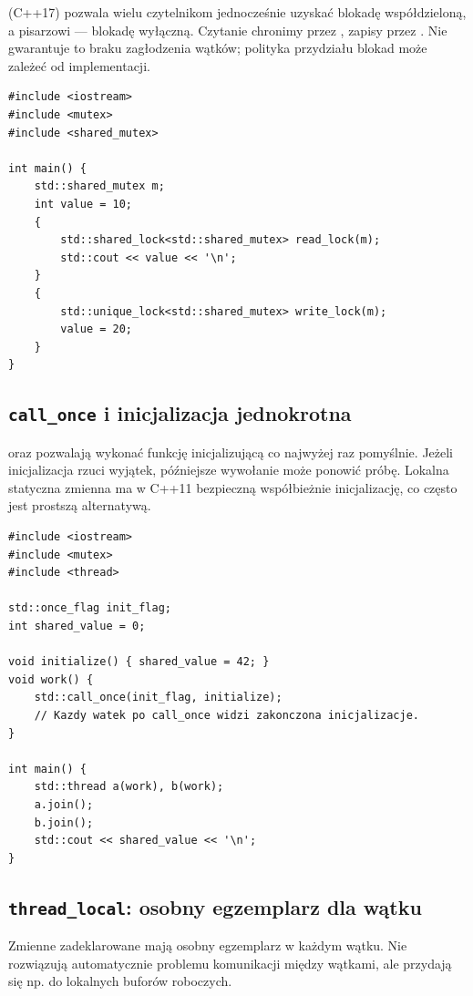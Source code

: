  (C++17) pozwala wielu czytelnikom jednocześnie
uzyskać blokadę współdzieloną, a pisarzowi --- blokadę wyłączną.
Czytanie chronimy przez , zapisy przez
. Nie gwarantuje to braku zagłodzenia wątków;
polityka przydziału blokad może zależeć od implementacji.

\begin{lstlisting}[caption={Blokada współdzielona i wyłączna (C++17).}]
#include <iostream>
#include <mutex>
#include <shared_mutex>

int main() {
    std::shared_mutex m;
    int value = 10;
    {
        std::shared_lock<std::shared_mutex> read_lock(m);
        std::cout << value << '\n';
    }
    {
        std::unique_lock<std::shared_mutex> write_lock(m);
        value = 20;
    }
}
\end{lstlisting}

\subsection{\texttt{call\_once} i inicjalizacja jednokrotna}

 oraz  pozwalają
wykonać funkcję inicjalizującą co najwyżej raz pomyślnie.
Jeżeli inicjalizacja rzuci wyjątek, późniejsze wywołanie może
ponowić próbę. Lokalna statyczna zmienna ma w C++11
bezpieczną współbieżnie inicjalizację, co często jest prostszą alternatywą.

\begin{lstlisting}[caption={Inicjalizacja wykonywana raz (C++11).}]
#include <iostream>
#include <mutex>
#include <thread>

std::once_flag init_flag;
int shared_value = 0;

void initialize() { shared_value = 42; }
void work() {
    std::call_once(init_flag, initialize);
    // Kazdy watek po call_once widzi zakonczona inicjalizacje.
}

int main() {
    std::thread a(work), b(work);
    a.join();
    b.join();
    std::cout << shared_value << '\n';
}
\end{lstlisting}

\subsection{\texttt{thread\_local}: osobny egzemplarz dla wątku}

Zmienne zadeklarowane  mają osobny egzemplarz
w każdym wątku. Nie rozwiązują automatycznie problemu komunikacji
między wątkami, ale przydają się np. do lokalnych buforów roboczych.

